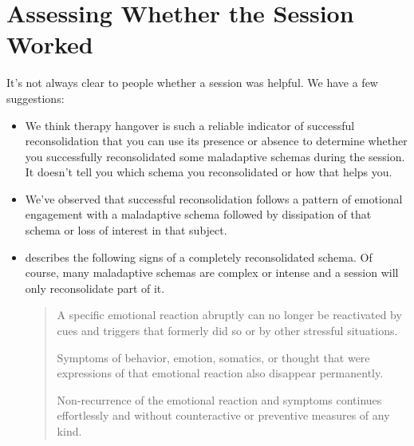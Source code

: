 \documentclass[12pt,letterpaper]{book}
\begin{document}
\section{Assessing Whether the Session Worked}
It's not always clear to people whether a session was helpful. We have a few suggestions:
\begin{itemize}
    \item We think therapy hangover is such a reliable indicator of successful reconsolidation that you can use its presence or absence to determine whether you successfully reconsolidated some maladaptive schemas during the session. It doesn't tell you which schema you reconsolidated or how that helps you.
    \item We've observed that successful reconsolidation follows a pattern of emotional engagement with a maladaptive schema followed by dissipation of that schema or loss of interest in that subject.
    \item \textcite{eckerUnlocking} describes the following signs of a completely reconsolidated schema. Of course, many maladaptive schemas are complex or intense and a session will only reconsolidate part of it.
    \begin{quotation}
        A specific emotional reaction abruptly can no longer be reactivated by cues and triggers that formerly did so or by other stressful situations.
        
        Symptoms of behavior, emotion, somatics, or thought that were expressions of that emotional reaction also disappear permanently.
        
        Non-recurrence of the emotional reaction and symptoms continues effortlessly and without counteractive or preventive measures of any kind.
    \end{quotation}
\end{itemize}
\end{document}
